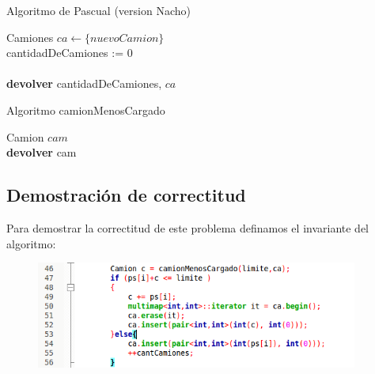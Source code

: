 \begin{algorithm}[H]
	\SetAlgoLined
	\caption{Algoritmo de Pascual (version Nacho)}

	Camiones $ca \leftarrow \{nuevoCamion\}$\\
	cantidadDeCamiones := 0\\
	\\
	\textbf{devolver} cantidadDeCamiones, $ca$



\end{algorithm}

\begin{algorithm}[H]
	\SetAlgoLined
	\caption{Algoritmo camionMenosCargado}

	Camion $cam$  \\
	\textbf{devolver} cam



\end{algorithm}

\subsection{Demostración de correctitud}

Para demostrar la correctitud de este problema definamos el invariante del algoritmo:
\begin{figure}[H] %
\begin{center}
\includegraphics[width=300pt]{../imgs/demo11.png}
\end{center}
\end{figure}

